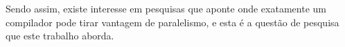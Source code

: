 Sendo assim, existe interesse em pesquisas que aponte onde exatamente um compilador
pode tirar vantagem de paralelismo, e esta é a questão de pesquisa que este
trabalho aborda.



%
%
%
%
